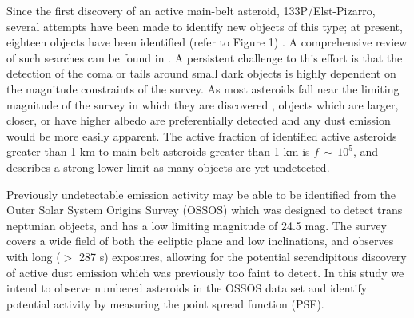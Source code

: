 \documentclass[iop,apj]{emulateapj}
\begin{document}



Since the first discovery of an active main-belt asteroid, 133P/Elst-Pizarro, several attempts have been made to identify new objects of this type; at present, eighteen objects have been identified (refer to Figure 1) \citep{jewitt15}. A comprehensive review of such searches can be found in \citet{hsieh15}.  A persistent challenge to this effort is that the detection of the coma or tails around small dark objects is highly dependent on the magnitude constraints of the survey. As most asteroids fall near the limiting magnitude of the survey in which they are discovered \citep{jewitt15}%
, objects which are larger, closer, or have higher albedo are preferentially detected and any dust emission would be more easily apparent. The active fraction of identified active asteroids greater than 1 km to main belt asteroids greater than 1 km is $f \, \sim \, 10^5$, and describes a strong lower limit as many objects are yet undetected. \citep{jewitt15} %


Previously undetectable emission activity may be able to be identified from the Outer Solar System Origins Survey (OSSOS) which was designed to detect trans neptunian objects, and has a low limiting magnitude of 24.5 mag. The survey covers a wide field of both the ecliptic plane and low inclinations, and observes with long ($>$ 287 s) exposures, allowing for the potential serendipitous discovery of active dust emission which was previously too faint to detect. In this study we intend to observe numbered asteroids in the OSSOS data set and identify potential activity by measuring the point spread function (PSF).
\end{document}
